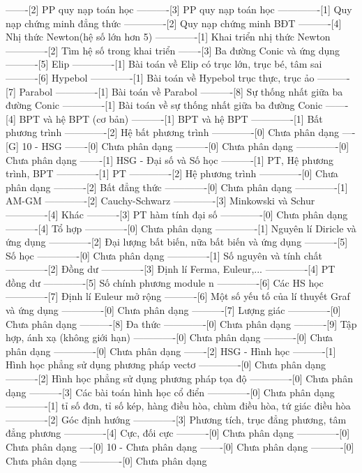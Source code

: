 -------[2] PP quy nạp toán học
----------[3] PP quy nạp toán học
-------------[1] Quy nạp chứng minh đẳng thức
-------------[2] Quy nạp chứng minh BĐT
----------[4] Nhị thức Newton(hệ số lớn hơn 5)
-------------[1] Khai triển nhị thức Newton
-------------[2] Tìm hệ số trong khai triển
-------[3] Ba đường Conic và ứng dụng
----------[5] Elip
-------------[1] Bài toán về Elip có trục lớn, trục bé, tâm sai
----------[6] Hypebol
-------------[1] Bài toán về Hypebol trục thực, trục ảo
----------[7] Parabol
-------------[1] Bài toán về Parabol
----------[8] Sự thống nhất giữa ba đường Conic
-------------[1] Bài toán về sự thống nhất giữa ba đường Conic
-------[4] BPT và hệ BPT (cơ bản)
----------[1] BPT và hệ BPT
-------------[1] Bất phương trình
-------------[2] Hệ bất phương trình
-------------[0] Chưa phân dạng
----[G] 10 - HSG
-------[0] Chưa phân dạng
----------[0] Chưa phân dạng
-------------[0] Chưa phân dạng
-------[1] HSG - Đại số và Số học 
----------[1] PT, Hệ phương trình, BPT
-------------[1] PT 
-------------[2] Hệ phương trình 
-------------[0] Chưa phân dạng
----------[2] Bất đẳng thức
-------------[0] Chưa phân dạng
-------------[1] AM-GM
-------------[2] Cauchy-Schwarz
-------------[3] Minkowski và Schur
-------------[4] Khác
----------[3] PT hàm tính đại số
-------------[0] Chưa phân dạng
----------[4] Tổ hợp 
-------------[0] Chưa phân dạng
-------------[1] Nguyên lí Diricle và ứng dụng
-------------[2] Đại lượng bất biến, nữa bất biến và ứng dụng
----------[5] Số học 
-------------[0] Chưa phân dạng
-------------[1] Số nguyên và tính chất
-------------[2] Đồng dư
-------------[3] Định lí Ferma, Euleur,...
-------------[4] PT đồng dư
-------------[5] Số chính phương module n
-------------[6] Các HS học
-------------[7] Định lí Euleur mở rộng
----------[6] Một số yếu tố của lí thuyết Graf và ứng dụng
-------------[0] Chưa phân dạng
----------[7] Lượng giác
-------------[0] Chưa phân dạng
----------[8] Đa thức
-------------[0] Chưa phân dạng
----------[9] Tập hợp, ánh xạ (không giới hạn)
-------------[0] Chưa phân dạng
----------[0] Chưa phân dạng
-------------[0] Chưa phân dạng
-------[2] HSG - Hình học
----------[1] Hình học phẳng sử dụng phương pháp vectơ
-------------[0] Chưa phân dạng
----------[2] Hình học phẳng sử dụng phương pháp tọa độ
-------------[0] Chưa phân dạng
----------[3] Các bài toán hình học cổ điển
-------------[0] Chưa phân dạng
-------------[1] tỉ số đơn, tỉ số kép, hàng điều hòa, chùm điều hòa, tứ giác điều hòa
-------------[2] Góc định hướng
-------------[3] Phương tích, trục đẳng phương, tâm đẳng phương
-------------[4] Cực, đối cực
----------[0] Chưa phân dạng
-------------[0] Chưa phân dạng
----[0] 10 - Chưa phân dạng
-------[0] Chưa phân dạng
----------[0] Chưa phân dạng
-------------[0] Chưa phân dạng

